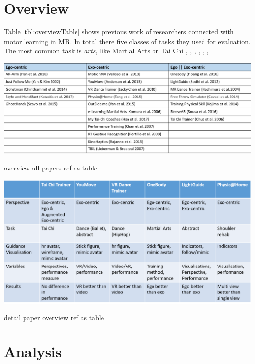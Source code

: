 \section{Overview}
Table \ref{tbl:overviewTable} shows previous work of researchers connected with motor learning in MR. In total there five classes of tasks they used for evaluation. The most common task is \textit{arts}, like Martial Arts or Tai Chi \cite{Han2016}, \cite{Yan2015}, \cite{Katzakis2017}, \cite{Han2017}, \cite{Portillo2008}, \cite{Hoang2016}, \cite{Chua2003} \cite{Anderson2013a}
\begin{table}
	\centering
	\includegraphics[width=1.0\textwidth]{img/overview_table.png}
	\caption{overview all papers \todo ref as table}
	\label{tbl:overviewTable}
\end{table}
\begin{table}
	\centering
	\includegraphics[width=1.0\textwidth]{img/detail_paper_overview.png}
	\caption{detail paper overview \todo ref as table}
	\label{tbl:detailOverviewTable}
\end{table}


\section{Analysis}
